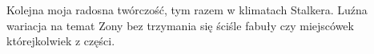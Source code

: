 \documentclass[./MAIN.tex]{subfiles}
\begin{document}
Kolejna moja radosna twórczość, tym razem w klimatach Stalkera. Luźna wariacja
na temat Zony bez trzymania się ściśle fabuły czy miejscówek którejkolwiek z
części.
\end{document}
